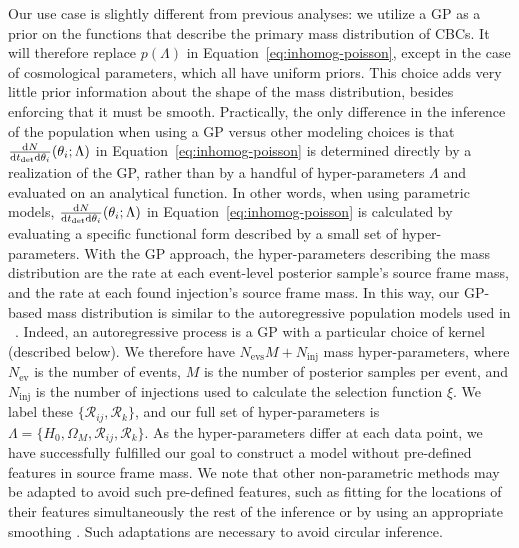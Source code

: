 \documentclass[]{aastex631}
\begin{document}
Our use case is slightly different from previous analyses:
we utilize a \ac{GP} as a prior on the functions that describe the primary mass distribution of \acp{CBC}.
It will therefore replace $p(\Lambda)$ in Equation~\ref{eq:inhomog-poisson}, except in the case of cosmological parameters, which all have uniform priors.
This choice adds very little prior information about the shape of the mass distribution, besides enforcing that it must be smooth.
Practically, the only difference in the inference of the population when using a GP versus other modeling choices is that $\frac{\text{d} N}{\text{d} t_{\det} \text{d} \theta_i} (\theta_i;\Lambda)$ in Equation~\ref{eq:inhomog-poisson} is determined directly by a realization of the \ac{GP}, rather than by a handful of hyper-parameters $\Lambda$ and evaluated on an analytical function.
In other words, when using parametric models, $\frac{\text{d} N}{\text{d} t_{\det} \text{d} \theta_i} (\theta_i;\Lambda)$ in Equation~\ref{eq:inhomog-poisson} is calculated by evaluating a specific functional form described by a small set of hyper-parameters. 
With the \ac{GP} approach, the hyper-parameters describing the mass distribution are the rate at each event-level posterior sample's source frame mass, and the rate at each found injection's source frame mass.
In this way, our \ac{GP}-based mass distribution is similar to the autoregressive population models used in ~\citet{callister_parameter-free_2023}.
Indeed, an autoregressive process is a \ac{GP} with a particular choice of kernel (described below).
We therefore have $N_{\text{evs}}M + N_{\text{inj}}$ mass hyper-parameters, where $N_{\text{ev}}$ is the number of events, $M$ is the number of posterior samples per event, and $N_{\text{inj}}$ is the number of injections used to calculate the selection function $\xi$.
We label these $\{\mathcal{R}_{ij},\mathcal{R}_k\}$, and our full set of hyper-parameters is $\Lambda=\{H_0, \Omega_M, \mathcal{R}_{ij},\mathcal{R}_k\}$. 
As the hyper-parameters differ at each data point, we have successfully fulfilled our goal to construct a model without pre-defined features in source frame mass.
We note that other non-parametric methods may be adapted to avoid such pre-defined features, such as fitting for the locations of their features simultaneously the rest of the inference \citep[e.g.][]{tiwari_vamana_2021} or by using an appropriate smoothing \citep[e.g.][]{edelman_cover_2023}. 
Such adaptations are necessary to avoid circular inference.
\end{document}
